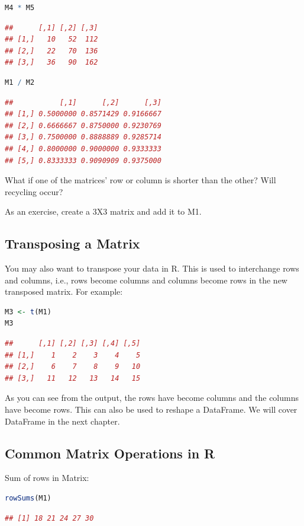 \documentclass[10pt]{book}
\begin{document}
\begin{lstlisting}[language=R]
M4 * M5
\end{lstlisting}
\begin{lstlisting}[language=R]
##      [,1] [,2] [,3]
## [1,]   10   52  112
## [2,]   22   70  136
## [3,]   36   90  162
\end{lstlisting}
\begin{lstlisting}[language=R]
M1 / M2
\end{lstlisting}
\begin{lstlisting}[language=R]
##           [,1]      [,2]      [,3]
## [1,] 0.5000000 0.8571429 0.9166667
## [2,] 0.6666667 0.8750000 0.9230769
## [3,] 0.7500000 0.8888889 0.9285714
## [4,] 0.8000000 0.9000000 0.9333333
## [5,] 0.8333333 0.9090909 0.9375000
\end{lstlisting}
What if one of the matrices' row or column is shorter than the other? Will recycling occur?

As an exercise, create a 3X3 matrix and add it to M1.

\subsection{Transposing a Matrix}
You may also want to transpose your data in R. This is used to interchange rows and columns, i.e., rows become columns and columns become rows in the new transposed matrix. For example:

\begin{lstlisting}[language=R]
M3 <- t(M1)
M3
\end{lstlisting}
\begin{lstlisting}[language=R]
##      [,1] [,2] [,3] [,4] [,5]
## [1,]    1    2    3    4    5
## [2,]    6    7    8    9   10
## [3,]   11   12   13   14   15
\end{lstlisting}
As you can see from the output, the rows have become columns and the columns have become rows. This can also be used to reshape a DataFrame. We will cover DataFrame in the next chapter.

\subsection{Common Matrix Operations in R}
Sum of rows in Matrix:
\begin{lstlisting}[language=R]
rowSums(M1)
\end{lstlisting}
\begin{lstlisting}[language=R]
## [1] 18 21 24 27 30
\end{lstlisting}
\end{document}
